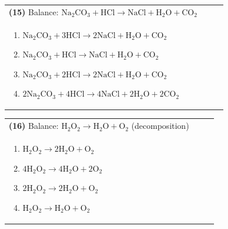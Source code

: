 \documentclass{article}
\begin{document}
{\vspace{0.2cm}
\noindent \begin{tabular}{|p{0.9\linewidth}|}
\hline
\vspace{0.2cm}
\textbf{(15)} Balance: \(\mathrm{Na_2CO_3 + HCl \rightarrow NaCl + H_2O + CO_2}\)\\
\begin{minipage}[t]{0.85\linewidth}
\begin{enumerate}[label=\alph*.]
   \item \(\mathrm{Na_2CO_3 + 3HCl \rightarrow 2NaCl + H_2O + CO_2}\)
   \item \(\mathrm{Na_2CO_3 + HCl \rightarrow NaCl + H_2O + CO_2}\)
   \item \(\mathrm{Na_2CO_3 + 2HCl \rightarrow 2NaCl + H_2O + CO_2}\)
   \item \(\mathrm{2Na_2CO_3 + 4HCl \rightarrow 4NaCl + 2H_2O + 2CO_2}\)
\end{enumerate}
\end{minipage}\\
\hline
\end{tabular}

\vspace{0.2cm}
\noindent \begin{tabular}{|p{0.9\linewidth}|}
\hline
\vspace{0.2cm}
\textbf{(16)} Balance: \(\mathrm{H_2O_2 \rightarrow H_2O + O_2}\) (decomposition)\\
\begin{minipage}[t]{0.85\linewidth}
\begin{enumerate}[label=\alph*.]
   \item \(\mathrm{H_2O_2 \rightarrow 2H_2O + O_2}\)
   \item \(\mathrm{4H_2O_2 \rightarrow 4H_2O + 2O_2}\)
   \item \(\mathrm{2H_2O_2 \rightarrow 2H_2O + O_2}\)
   \item \(\mathrm{H_2O_2 \rightarrow H_2O + O_2}\)
\end{enumerate}
\end{minipage}\\
\hline
\end{tabular}
\newpage

}
\end{document}
